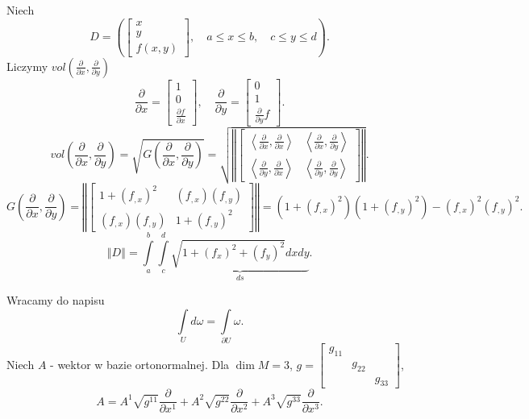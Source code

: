 \documentclass[../main.tex]{subfiles}
\begin{document}
\begin{przyklad}
    Niech
     \[
         D = \left( \begin{bmatrix} x\\y\\f(x,y) \end{bmatrix},\quad a\le x\le b,\quad c\le y \le d  \right)
    .\]
Liczymy $vol(\frac{\partial }{\partial x} , \frac{\partial }{\partial y}) $
\[
\frac{\partial }{\partial x} = \begin{bmatrix} 1\\0\\ \frac{\partial f}{\partial x} \end{bmatrix}, \quad \frac{\partial }{\partial y} = \begin{bmatrix} 0\\1\\ \frac{\partial }{\partial y} f \end{bmatrix}
.\]
\[
    vol(\frac{\partial }{\partial x} , \frac{\partial }{\partial y} ) = \sqrt{G\left(\frac{\partial }{\partial x} , \frac{\partial }{\partial y} \right)} = \sqrt{\left\Vert \begin{bmatrix} \left<\frac{\partial }{\partial x} , \frac{\partial }{\partial x}  \right>& \left<\frac{\partial }{\partial x} , \frac{\partial }{\partial y}  \right>\\ \left<\frac{\partial }{\partial y} , \frac{\partial }{\partial x}  \right>& \left<\frac{\partial }{\partial y} , \frac{\partial }{\partial y}  \right> \end{bmatrix}  \right\Vert }
.\]
\[
    G\left( \frac{\partial }{\partial x} , \frac{\partial }{\partial y}  \right) = \left\Vert \begin{bmatrix} 1 + (f_{,x})^2& (f_{,x})(f_{,y})\\ (f_{,x})(f_{,y})& 1 + (f_{,y})^2 \end{bmatrix}  \right\Vert = \left( 1 + (f_{,x})^2 \right) \left( 1 + (f_{,y})^2 \right)  - (f_{,x})^2(f_{,y})^2
.\]
\[
    \left\Vert D \right\Vert = \int\limits_a^b\int\limits_c^d \underbrace{\sqrt{1 + (f_x)^2 + (f_y)^2} dxdy}_{ds}
.\]
\end{przyklad}
Wracamy do napisu
\[
\int\limits_Ud\omega = \int\limits_{\partial U}\omega
.\]
Niech $A$ - wektor w bazie ortonormalnej. Dla $\dim M = 3$, $g = \begin{bmatrix} g_{11}&&\\&g_{22}&\\&&g_{33} \end{bmatrix} $,
    \[
    A = A^1 \sqrt{g^{11}} \frac{\partial }{\partial x^1} + A^2 \sqrt{g^{22}} \frac{\partial }{\partial x^2} + A^3 \sqrt{g^{33}} \frac{\partial }{\partial x^3}
    .\]
\end{document}
